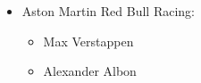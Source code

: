 \documentclass{report}
\begin{document}
\begin{itemize}
\begin{itemize}
\begin{figure}[!h]
\begin{floatrow}
            \end{floatrow}
            \end{figure}
        \end{itemize}
    \item Aston Martin Red Bull Racing: 
        \begin{itemize}
            \item Max Verstappen
            \item Alexander Albon
            \begin{figure}[!h]
            \begin{floatrow}

\end{floatrow}
\end{figure}
\end{itemize}
\end{itemize}
\end{document}
